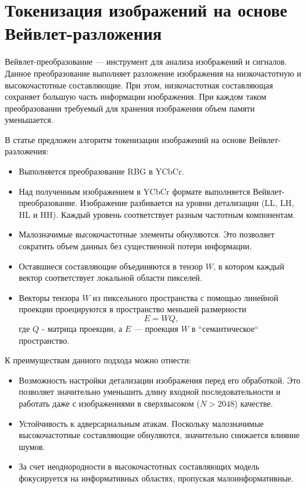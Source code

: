 \documentclass[times,specification,annotation]{itmo-student-thesis}
\begin{document}
\section{Токенизация изображений на основе Вейвлет-разложения}
Вейвлет-преобразование --- инструмент для анализа изображений и сигналов. Данное преобразование выполняет разложение изображения на низкочастотную и высокочастотные составляющие. При этом, низкочастотная составляющая сохраняет большую часть информации изображения. При каждом таком преобразовании требуемый для хранения изображения объем памяти уменьшается.

В статье \cite{wavelet_tokenization} предложен алгоритм токенизации изображений на основе Вейвлет-разложения:

\begin{itemize}
    \item Выполняется преобразование RBG в YCbCr.
    \item Над полученным изображением в YCbCr формате выполняется Вейвлет-преобразование. Изображение разбивается на уровни детализации (LL, LH, HL и HH). Каждый уровень соответствует разным частотным компонентам.
    \item Малозначимые высокочастотные элементы обнуляются. Это позволяет сократить объем данных без существенной потери информации.
    \item Оставшиеся составляющие объединяются в тензор $W$, в котором каждый вектор соответствует локальной области пикселей.
    \item Векторы тензора $W$ из пиксельного пространства с помощью линейной проекции проецируются в пространство меньшей размерности 
    $$
    E = W Q,
    $$
    где $Q$ - матрица проекции, а $E$ --- проекция $W$ в ``семантическое`` пространство.
\end{itemize}

К преимуществам данного подхода можно отнести:

\begin{itemize}
    \item Возможность настройки детализации изображения перед его обработкой. Это позволяет значительно уменьшить длину входной последовательности и работать даже с изображениями в сверхвысоком ($N > 2048$) качестве.
    \item Устойчивость к адверсариальным атакам. Поскольку малозначимые высокочастотные составляющие обнуляются, значительно снижается влияние шумов.
    \item За счет неоднородности в высокочастотных составляющих модель фокусируется на информативных областях, пропуская малоинформативные.
\end{itemize}
\end{document}
